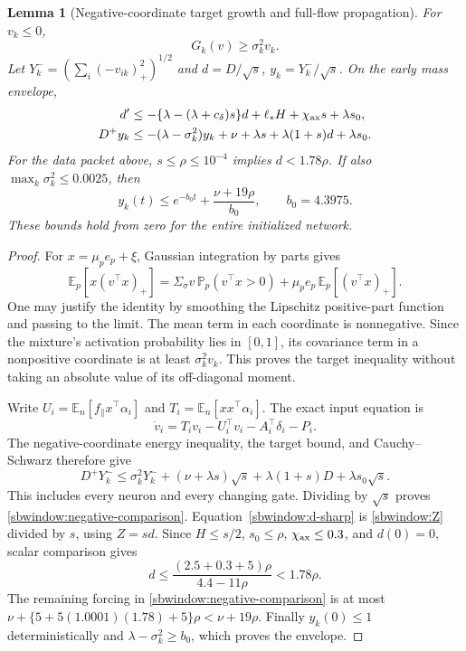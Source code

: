 \documentclass{article} %
\theoremstyle{plain}
\newtheorem{lemma}[theorem]{Lemma}
\theoremstyle{definition}
\theoremstyle{remark}
\begin{document}
\begin{lemma}[Negative-coordinate target growth and full-flow propagation]
\label{sbwindow:negative-coordinates}
For $v_k\le0$,
\[
 G_k(v)\ge\sigma_k^2v_k.
\]
Let $Y_k^-=(\sum_i(-v_{ik})_+^2)^{1/2}$ and
$d=D/\sqrt{s}$, $y_k=Y_k^-/\sqrt{s}$. On the early mass envelope,
\begin{align}
 d'&\le-\{\lambda-(\lambda+c_\delta)s\}d
                 +\ell_*H+\chi_{\rm ax}s+\lambda s_0,
                      \label{sbwindow:d-sharp}\\
 D^+y_k&\le-(\lambda-\sigma_k^2)y_k+
                \nu+\lambda s+\lambda(1+s)d+\lambda s_0.
                      \label{sbwindow:negative-comparison}
\end{align}
For the data packet above, $s\le\rho\le10^{-4}$ implies
$d<1.78\rho$. If also $\max_k\sigma_k^2\le0.0025$, then
\begin{equation}\label{sbwindow:negative-envelope}
 y_k(t)\le e^{-b_0t}+\frac{\nu+19\rho}{b_0},\qquad b_0=4.3975.
\end{equation}
These bounds hold from zero for the entire initialized network.
\end{lemma}
\begin{proof}
For $x=\mu_p e_p+\xi$, Gaussian integration by parts gives
\[
 \mathbb E_p[x(v^\top x)_+]
 =\Sigma_\sigma v\,\mathbb P_p(v^\top x>0)
            +\mu_p e_p\,\mathbb E_p[(v^\top x)_+].
\]
One may justify the identity by smoothing the Lipschitz positive-part
function and passing to the limit. The mean term in each coordinate is
nonnegative. Since the mixture's activation probability lies in $[0,1]$,
its covariance term in a nonpositive coordinate is at least
$\sigma_k^2v_k$. This proves the target inequality without taking an
absolute value of its off-diagonal moment.

Write $U_i=\mathbb E_n[f_\parallel x^\top\alpha_i]$ and
$T_i=\mathbb E_n[xx^\top\alpha_i]$. The exact input equation is
\[
 \dot v_i=T_iv_i-U_i^\top v_i-A_i^\top\delta_i-P_i.
\]
The negative-coordinate energy inequality, the target bound, and
Cauchy--Schwarz therefore give
\[
 D^+Y_k^-\le\sigma_k^2Y_k^-+
       (\nu+\lambda s)\sqrt{s}+\lambda(1+s)D+
                       \lambda s_0\sqrt{s}.
\]
This includes every neuron and every changing gate. Dividing by
$\sqrt{s}$ proves \eqref{sbwindow:negative-comparison}.
Equation~\eqref{sbwindow:d-sharp} is \eqref{sbwindow:Z} divided by $s$,
using $Z=sd$. Since $H\le s/2$, $s_0\le\rho$, $\chi_{\rm ax}\le0.3$,
and $d(0)=0$, scalar comparison gives
\[
 d\le\frac{(2.5+0.3+5)\rho}{4.4-11\rho}<1.78\rho.
\]
The remaining forcing in \eqref{sbwindow:negative-comparison} is at most
$\nu+\{5+5(1.0001)(1.78)+5\}\rho<\nu+19\rho$.
Finally $y_k(0)\le1$ deterministically and
$\lambda-\sigma_k^2\ge b_0$, which proves the envelope.
\end{proof}
\end{document}
